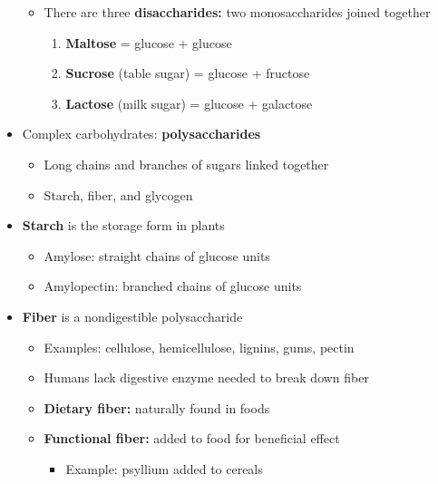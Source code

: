 \documentclass[12pt]{article}
\begin{document}
\begin{itemize}
\begin{itemize}
                        \item There are three \textbf{disaccharides:} two monosaccharides joined together
                            \begin{enumerate}
                                \item \textbf{Maltose} = glucose + glucose
                                \item \textbf{Sucrose} (table sugar) = glucose + fructose
                                \item \textbf{Lactose} (milk sugar) = glucose + galactose
                            \end{enumerate}
                    \end{itemize}
                \item Complex carbohydrates: \textbf{polysaccharides}
                    \begin{itemize}
                        \item Long chains and branches of sugars linked together
                        \item Starch, fiber, and glycogen
                    \end{itemize}
                \item \textbf{Starch} is the storage form in plants
                    \begin{itemize}
                        \item Amylose: straight chains of glucose units
                        \item Amylopectin: branched chains of glucose units
                    \end{itemize}
                \item \textbf{Fiber} is a nondigestible polysaccharide
                    \begin{itemize}
                        \item Examples: cellulose, hemicellulose, lignins, gums, pectin
                        \item Humans lack digestive enzyme needed to break down fiber
                        \item \textbf{Dietary fiber:} naturally found in foods
                        \item \textbf{Functional fiber:} added to food for beneficial effect
                            \begin{itemize}
                                \item Example: psyllium added to cereals

\end{itemize}
\end{itemize}
\end{itemize}
\end{document}
